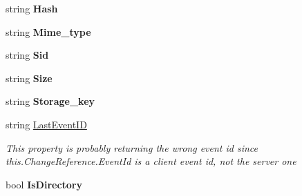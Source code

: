 \begin{DoxyCompactItemize}
\item 
\hypertarget{class_cloud_api_public_1_1_model_1_1_c_l_metadata_aae735f70eae728f64af780422d2fa87c}{string {\bfseries Hash}}\label{class_cloud_api_public_1_1_model_1_1_c_l_metadata_aae735f70eae728f64af780422d2fa87c}

\item 
\hypertarget{class_cloud_api_public_1_1_model_1_1_c_l_metadata_ab0f5abf1b56c2a2eb0ac7affb0326e22}{string {\bfseries Mime\-\_\-type}}\label{class_cloud_api_public_1_1_model_1_1_c_l_metadata_ab0f5abf1b56c2a2eb0ac7affb0326e22}

\item 
\hypertarget{class_cloud_api_public_1_1_model_1_1_c_l_metadata_a7cac999dbbe3d8481e3ba5a028b2fe0d}{string {\bfseries Sid}}\label{class_cloud_api_public_1_1_model_1_1_c_l_metadata_a7cac999dbbe3d8481e3ba5a028b2fe0d}

\item 
\hypertarget{class_cloud_api_public_1_1_model_1_1_c_l_metadata_a52f7abcb717a1a81261dd3550e97cfdb}{string {\bfseries Size}}\label{class_cloud_api_public_1_1_model_1_1_c_l_metadata_a52f7abcb717a1a81261dd3550e97cfdb}

\item 
\hypertarget{class_cloud_api_public_1_1_model_1_1_c_l_metadata_a149721569831914dc7c6de65c8c1cf22}{string {\bfseries Storage\-\_\-key}}\label{class_cloud_api_public_1_1_model_1_1_c_l_metadata_a149721569831914dc7c6de65c8c1cf22}

\item 
string \hyperlink{class_cloud_api_public_1_1_model_1_1_c_l_metadata_a745145082b6a672987eb4ca888890cd3}{Last\-Event\-I\-D}
\begin{DoxyCompactList}\small\item\em This property is probably returning the wrong event id since this.\-Change\-Reference.\-Event\-Id is a client event id, not the server one \end{DoxyCompactList}\item 
\hypertarget{class_cloud_api_public_1_1_model_1_1_c_l_metadata_adbdc6a792f99d213091acecfb99a387d}{bool {\bfseries Is\-Directory}}\label{class_cloud_api_public_1_1_model_1_1_c_l_metadata_adbdc6a792f99d213091acecfb99a387d}


\end{DoxyCompactItemize}
